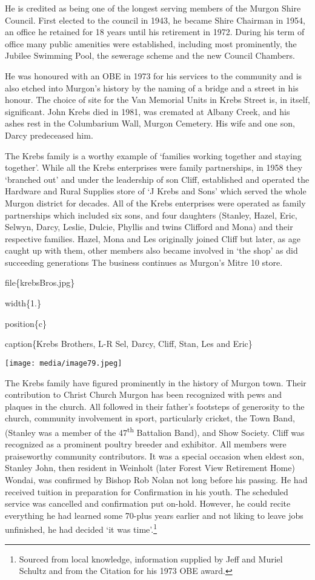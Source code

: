 He is credited as being one of the longest serving members of the Murgon Shire Council. First elected to the council in 1943, he became Shire Chairman in 1954, an office he retained for 18 years until his retirement in 1972. During his term of office many public amenities were established, including most prominently, the Jubilee Swimming Pool, the sewerage scheme and the new Council Chambers.

He was honoured with an OBE in 1973 for his services to the community and is also etched into Murgon's history by the naming of a bridge and a street in his honour. The choice of site for the Van Memorial Units in Krebs Street is, in itself, significant. John Krebs died in 1981, was cremated at Albany Creek, and his ashes rest in the Columbarium Wall, Murgon Cemetery. His wife and one son, Darcy predeceased him.

The Krebs family is a worthy example of `families working together and staying together'. While all the Krebs enterprises were family partnerships, in 1958 they `branched out' and under the leadership of son Cliff, established and operated the Hardware and Rural Supplies store of `J Krebs and Sons' which served the whole Murgon district for decades. All of the Krebs enterprises were operated as family partnerships which included six sons, and four daughters (Stanley, Hazel, Eric, Selwyn, Darcy, Leslie, Dulcie, Phyllis and twins Clifford and Mona) and their respective families. Hazel, Mona and Les originally joined Cliff but later, as age caught up with them, other members also became involved in `the shop' as did succeeding generations The business continues as Murgon's Mitre 10 store.

file\{krebsBros.jpg\}

width\{1.\}

position\{c\}

caption\{Krebs Brothers, L-R Sel, Darcy, Cliff, Stan, Les and Eric\}

\texttt{[image: media/image79.jpeg]}

The Krebs family have figured prominently in the history of Murgon town. Their contribution to Christ Church Murgon has been recognized with pews and plaques in the church. All followed in their father's footsteps of generosity to the church, community involvement in sport, particularly cricket, the Town Band, (Stanley was a member of the 47\textsuperscript{th} Battalion Band), and Show Society. Cliff was recognized as a prominent poultry breeder and exhibitor. All members were praiseworthy community contributors. It was a special occasion when eldest son, Stanley John, then resident in Weinholt (later Forest View Retirement Home) Wondai, was confirmed by Bishop Rob Nolan not long before his passing. He had received tuition in preparation for Confirmation in his youth. The scheduled service was cancelled and confirmation put on-hold. However, he could recite everything he had learned some 70-plus years earlier and not liking to leave jobs unfinished, he had decided `it was time'.\footnote{Sourced from local knowledge, information supplied by Jeff and Muriel Schultz and from the Citation for his 1973 OBE award.}

